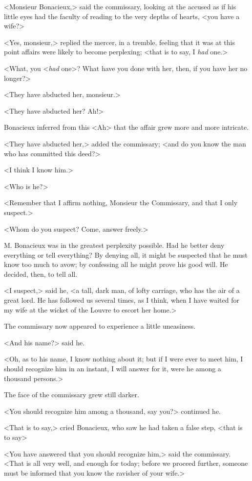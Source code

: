 <Monsieur Bonacieux,> said the commissary, looking at the accused as if his little eyes had the faculty of reading to the very depths of hearts, <you have a wife?> 

<Yes, monsieur,> replied the mercer, in a tremble, feeling that it was at this point affairs were likely to become perplexing; <that is to say, I \textit{had} one.> 

<What, you <\textit{had} one>? What have you done with her, then, if you have her no longer?> 

<They have abducted her, monsieur.> 

<They have abducted her? Ah!> 

Bonacieux inferred from this <Ah> that the affair grew more and more intricate. 

<They have abducted her,> added the commissary; <and do you know the man who has committed this deed?> 

<I think I know him.> 

<Who is he?> 

<Remember that I affirm nothing, Monsieur the Commissary, and that I only suspect.> 

<Whom do you suspect? Come, answer freely.> 

M. Bonacieux was in the greatest perplexity possible. Had he better deny everything or tell everything? By denying all, it might be suspected that he must know too much to avow; by confessing all he might prove his good will. He decided, then, to tell all. 

<I suspect,> said he, <a tall, dark man, of lofty carriage, who has the air of a great lord. He has followed us several times, as I think, when I have waited for my wife at the wicket of the Louvre to escort her home.> 

The commissary now appeared to experience a little uneasiness. 

<And his name?> said he. 

<Oh, as to his name, I know nothing about it; but if I were ever to meet him, I should recognize him in an instant, I will answer for it, were he among a thousand persons.> 

The face of the commissary grew still darker. 

<You should recognize him among a thousand, say you?> continued he. 

<That is to say,> cried Bonacieux, who saw he had taken a false step, <that is to say\longdash> 

<You have answered that you should recognize him,> said the commissary. <That is all very well, and enough for today; before we proceed further, someone must be informed that you know the ravisher of your wife.> 

